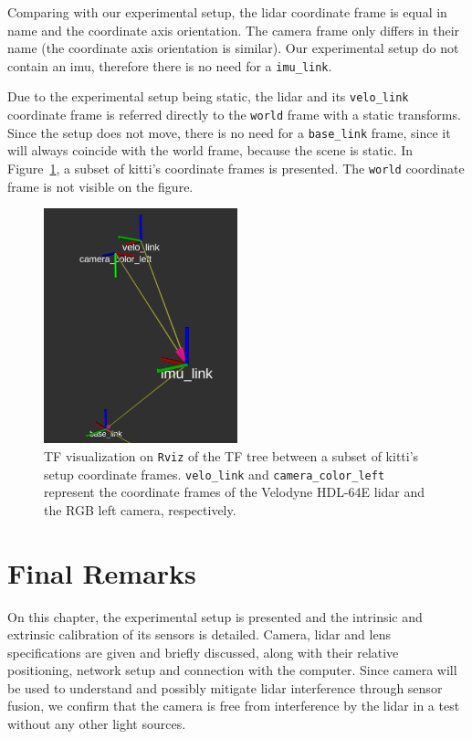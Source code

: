 Comparing with our experimental setup, the \ac{lidar} coordinate frame is equal in name and the coordinate axis orientation. The camera frame only differs in their name (the coordinate axis orientation is similar). Our experimental setup do not contain an \ac{imu}, therefore there is no need for a \texttt{imu\_link}. 

Due to the experimental setup being static, the \ac{lidar} and its \texttt{velo\_link} coordinate frame is referred directly to the \texttt{world} frame with a static transforms. Since the setup does not move, there is no need for a \texttt{base\_link} frame, since it will always coincide with the world frame, because the scene is static. In Figure~\ref{fig:kitti-tf-frames}, a subset of \ac{kitti}'s coordinate frames is presented. The \texttt{world} coordinate frame is not visible on the figure. 

\begin{figure}[!ht]
	\centering
	\includegraphics[width=0.5\textwidth]{img/KITTI/tf.png}
	\caption[Relevant \acs{kitti} TF tree coordinate frames.]{TF visualization on \texttt{Rviz} of the TF tree between a subset of \ac{kitti}'s setup coordinate frames. \texttt{velo\_link} and \texttt{camera\_color\_left} represent the coordinate frames of the Velodyne HDL-64E \ac{lidar} and the RGB left camera, respectively.}
	\label{fig:kitti-tf-frames}
\end{figure}

\section{Final Remarks}
\label{sec:calibration:final-remarks}

On this chapter, the experimental setup is presented and the intrinsic and extrinsic calibration of its sensors is detailed. Camera, \ac{lidar} and lens specifications are given and briefly discussed, along with their relative positioning, network setup and connection with the computer. Since camera will be used to understand and possibly mitigate \ac{lidar} interference through sensor fusion, we confirm that the camera is free from interference by the \ac{lidar} in a test without any other light sources.

